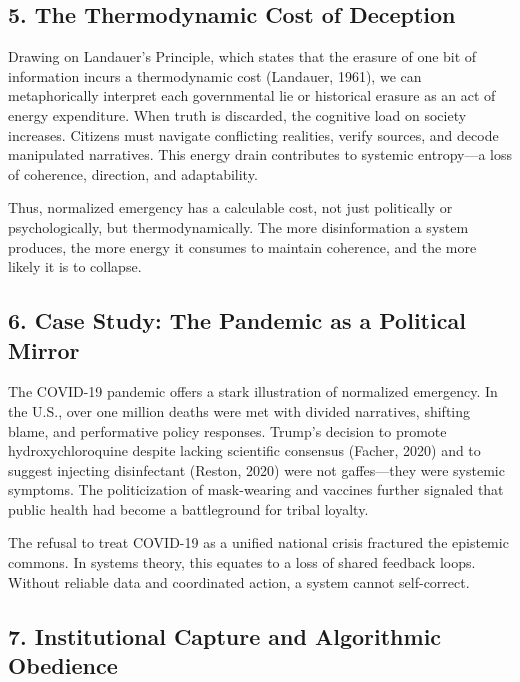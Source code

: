 \subsection{5. The Thermodynamic Cost of
Deception}\label{the-thermodynamic-cost-of-deception}

Drawing on Landauer's Principle, which states that the erasure of one
bit of information incurs a thermodynamic cost (Landauer, 1961), we can
metaphorically interpret each governmental lie or historical erasure as
an act of energy expenditure. When truth is discarded, the cognitive
load on society increases. Citizens must navigate conflicting realities,
verify sources, and decode manipulated narratives. This energy drain
contributes to systemic entropy---a loss of coherence, direction, and
adaptability.

Thus, normalized emergency has a calculable cost, not just politically
or psychologically, but thermodynamically. The more disinformation a
system produces, the more energy it consumes to maintain coherence, and
the more likely it is to collapse.

\subsection{6. Case Study: The Pandemic as a Political
Mirror}\label{case-study-the-pandemic-as-a-political-mirror}

The COVID-19 pandemic offers a stark illustration of normalized
emergency. In the U.S., over one million deaths were met with divided
narratives, shifting blame, and performative policy responses. Trump's
decision to promote hydroxychloroquine despite lacking scientific
consensus (Facher, 2020) and to suggest injecting disinfectant (Reston,
2020) were not gaffes---they were systemic symptoms. The politicization
of mask-wearing and vaccines further signaled that public health had
become a battleground for tribal loyalty.

The refusal to treat COVID-19 as a unified national crisis fractured the
epistemic commons. In systems theory, this equates to a loss of shared
feedback loops. Without reliable data and coordinated action, a system
cannot self-correct.

\subsection{7. Institutional Capture and Algorithmic
Obedience}\label{institutional-capture-and-algorithmic-obedience}

